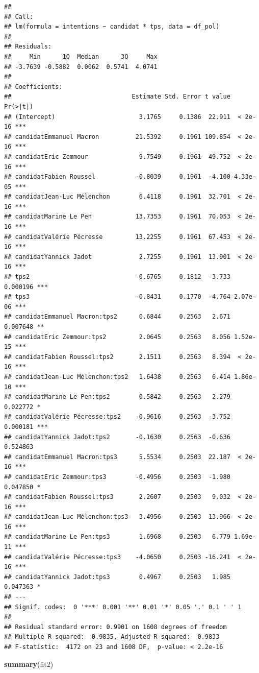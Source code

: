 \documentclass[
]{book}
\newenvironment{Shaded}{\begin{snugshade}}{\end{snugshade}}
\newcommand{\KeywordTok}[1]{\textcolor[rgb]{0.13,0.29,0.53}{\textbf{#1}}}
\newcommand{\NormalTok}[1]{#1}
\begin{document}
\begin{verbatim}
## 
## Call:
## lm(formula = intentions ~ candidat * tps, data = df_pol)
## 
## Residuals:
##     Min      1Q  Median      3Q     Max 
## -3.7639 -0.5882  0.0062  0.5741  4.0741 
## 
## Coefficients:
##                                 Estimate Std. Error t value Pr(>|t|)    
## (Intercept)                       3.1765     0.1386  22.911  < 2e-16 ***
## candidatEmmanuel Macron          21.5392     0.1961 109.854  < 2e-16 ***
## candidatEric Zemmour              9.7549     0.1961  49.752  < 2e-16 ***
## candidatFabien Roussel           -0.8039     0.1961  -4.100 4.33e-05 ***
## candidatJean-Luc Mélenchon        6.4118     0.1961  32.701  < 2e-16 ***
## candidatMarine Le Pen            13.7353     0.1961  70.053  < 2e-16 ***
## candidatValérie Pécresse         13.2255     0.1961  67.453  < 2e-16 ***
## candidatYannick Jadot             2.7255     0.1961  13.901  < 2e-16 ***
## tps2                             -0.6765     0.1812  -3.733 0.000196 ***
## tps3                             -0.8431     0.1770  -4.764 2.07e-06 ***
## candidatEmmanuel Macron:tps2      0.6844     0.2563   2.671 0.007648 ** 
## candidatEric Zemmour:tps2         2.0645     0.2563   8.056 1.52e-15 ***
## candidatFabien Roussel:tps2       2.1511     0.2563   8.394  < 2e-16 ***
## candidatJean-Luc Mélenchon:tps2   1.6438     0.2563   6.414 1.86e-10 ***
## candidatMarine Le Pen:tps2        0.5842     0.2563   2.279 0.022772 *  
## candidatValérie Pécresse:tps2    -0.9616     0.2563  -3.752 0.000181 ***
## candidatYannick Jadot:tps2       -0.1630     0.2563  -0.636 0.524863    
## candidatEmmanuel Macron:tps3      5.5534     0.2503  22.187  < 2e-16 ***
## candidatEric Zemmour:tps3        -0.4956     0.2503  -1.980 0.047850 *  
## candidatFabien Roussel:tps3       2.2607     0.2503   9.032  < 2e-16 ***
## candidatJean-Luc Mélenchon:tps3   3.4956     0.2503  13.966  < 2e-16 ***
## candidatMarine Le Pen:tps3        1.6968     0.2503   6.779 1.69e-11 ***
## candidatValérie Pécresse:tps3    -4.0650     0.2503 -16.241  < 2e-16 ***
## candidatYannick Jadot:tps3        0.4967     0.2503   1.985 0.047363 *  
## ---
## Signif. codes:  0 '***' 0.001 '**' 0.01 '*' 0.05 '.' 0.1 ' ' 1
## 
## Residual standard error: 0.9901 on 1608 degrees of freedom
## Multiple R-squared:  0.9835, Adjusted R-squared:  0.9833 
## F-statistic:  4172 on 23 and 1608 DF,  p-value: < 2.2e-16
\end{verbatim}

\begin{Shaded}
\begin{Highlighting}[]
\KeywordTok{summary}\NormalTok{(fit2)}
\end{Highlighting}
\end{Shaded}
\end{document}
